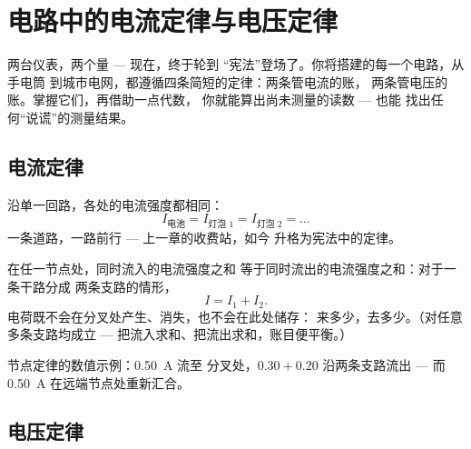 \chapter{电路中的电流定律与电压定律}\label{ch:g8:circuit-laws}

两台仪表，两个量 --- 现在，终于轮到
“宪法”登场了。你将搭建的每一个电路，从手电筒
到城市电网，都遵循四条简短的定律：两条管电流的账，
两条管电压的账。掌握它们，再借助一点代数，
你就能算出尚未测量的读数 --- 也能
找出任何“说谎”的测量结果。

\section{电流定律}

\begin{proposition}[串联回路的电流定律]\label{prop:g8:circuit-laws:seriesI}
沿单一回路，各处的电流强度都相同：
\[
I_{\text{电池}} = I_{\text{灯泡 1}} = I_{\text{灯泡 2}} =
\dots
\]
一条道路，一路前行 --- 上一章的收费站，如今
升格为宪法中的定律。
\end{proposition}

\begin{proposition}[节点定律]\label{prop:g8:circuit-laws:junction}
在任一节点处，同时流入的电流强度之和
等于同时流出的电流强度之和：对于一条干路分成
两条支路的情形，
\[
I = I_1 + I_2 .
\]
电荷既不会在分叉处产生、消失，也不会在此处储存：
来多少，去多少。（对任意多条支路均成立 ---
把流入求和、把流出求和，账目便平衡。）
\end{proposition}

\begin{omfigure}

{\small 节点定律的数值示例：\qty{0.50}{A} 流至
分叉处，$0.30 + 0.20$ 沿两条支路流出 --- 而
\qty{0.50}{A} 在远端节点处重新汇合。}
\end{omfigure}

\section{电压定律}

